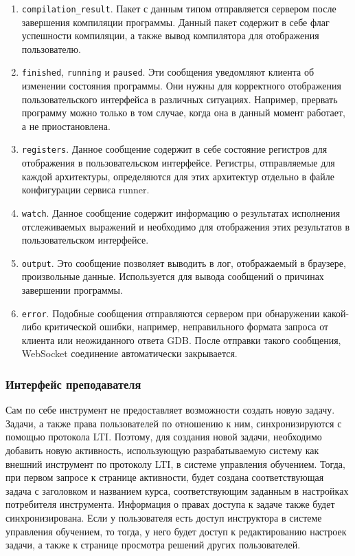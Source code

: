\documentclass[a4paper,article,14pt]{extarticle}
\begin{document}
\begin{enumerate}
    \item \texttt{compilation\_result}. Пакет с данным типом отправляется сервером после завершения компиляции программы. Данный пакет содержит в себе флаг успешности компиляции, а также вывод компилятора для отображения пользователю.
    \item \texttt{finished}, \texttt{running} и \texttt{paused}. Эти сообщения уведомляют клиента об изменении состояния программы. Они нужны для корректного отображения пользовательского интерфейса в различных ситуациях. Например, прервать программу можно только в том случае, когда она в данный момент работает, а не приостановлена.
    \item \texttt{registers}. Данное сообщение содержит в себе состояние регистров для отображения в пользовательском интерфейсе. Регистры, отправляемые для каждой архитектуры, определяются для этих архитектур отдельно в файле конфигурации сервиса runner.
    \item \texttt{watch}. Данное сообщение содержит информацию о результатах исполнения отслеживаемых выражений и необходимо для отображения этих результатов в пользовательском интерфейсе.
    \item \texttt{output}. Это сообщение позволяет выводить в лог, отображаемый в браузере, произвольные данные. Используется для вывода сообщений о причинах завершении программы.
    \item \texttt{error}. Подобные сообщения отправляются сервером при обнаружении какой-либо критической ошибки, например, неправильного формата запроса от клиента или неожиданного ответа GDB. После отправки такого сообщения, WebSocket соединение автоматически закрывается.
\end{enumerate}

\subsubsection{Интерфейс преподавателя}

Сам по себе инструмент не предоставляет возможности создать новую задачу. Задачи, а также права пользователей по отношению к ним, синхронизируются с помощью протокола LTI. Поэтому, для создания новой задачи, необходимо добавить новую активность, использующую разрабатываемую систему как внешний инструмент по протоколу LTI, в системе управления обучением. Тогда, при первом запросе к странице активности, будет создана соответствующая задача с заголовком и названием курса, соответствующим заданным в настройках потребителя инструмента. Информация о правах доступа к задаче также будет синхронизирована. Если у пользователя есть доступ инструктора в системе управления обучением, то тогда, у него будет доступ к редактированию настроек задачи, а также к странице просмотра решений других пользователей.
\end{document}
